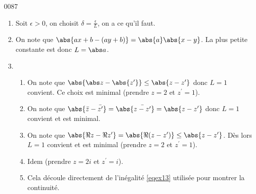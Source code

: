 
\begin{corrige}{0087}

\begin{enumerate}
\item Soit $\epsilon > 0$, on choisit $\delta = \frac\epsilon L$, on a ce qu'il faut.
\item On note que $\abs{a x + b - (a y + b)} = \abs{a}\abs{x-y}$. La plus petite constante est donc $L = \abs a$.
\item
  \begin{enumerate}
  \item On note que $\abs{\abs z - \abs {z^\prime}} \leq
    \abs{z-z^\prime}$ donc $L = 1$ convient. Ce choix est minimal
    (prendre $z = 2$ et $z^\prime = 1$).
  \item On note que $\abs{\bar z - \bar{z^\prime}} =
    \abs{\bar{z-z^\prime}} = \abs{z-z^\prime}$ donc $L = 1$ convient
    et est minimal.
  \item On note que $\abs{\Re z - \Re z^\prime} = \abs{\Re
      (z-z^\prime)} \leq \abs{z-z^\prime}$. Dès lors $L = 1$ convient
    et est minimal (prendre $z = 2$ et $z^\prime = 1$).
  \item Idem (prendre $z=2i$ et $z^\prime = i$).
  \item Cela découle directement de l'inégalité \eqref{eqex13} utilisée pour montrer la continuité.
\end{enumerate}

\end{enumerate}

\end{corrige}
